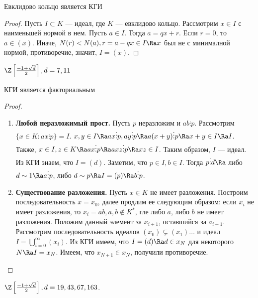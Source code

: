 \begin{theorem}
    Евклидово кольцо является КГИ
\end{theorem}
\begin{proof}
    Пусть \(I \subset K\) --- идеал, где \(K\) --- евклидово кольцо. Рассмотрим \(x \in I\) с наименьшей нормой в нем. Пусть \(a \in I\). Тогда \(a = qx + r\). Если \(r = 0\), то \(a \in (x)\). Иначе, \(N(r) < N(a), r = a - qx \in I \Ra x\) был не с минималной нормой, противоречие, значит, \(I = (x)\).
\end{proof}

\begin{example}
    \(\Z\left[ \frac{-1 + \sqrt{d}}{2} \right], d = 7, 11\)
\end{example}

\begin{theorem}
    КГИ является факториальным
\end{theorem}
\begin{proof}
    \begin{enumerate}
        \item \textbf{Любой неразложимый прост.} Пусть \(p\) неразложим и \(ab \vdots p\). Рассмотрим \(\{x \in K: ax \vdots p\} = I\). \(x, y \in I \Ra ax \vdots p, ay \vdots p \Ra a(x + y) \vdots p \Ra x + y \in I \Ra I\). Также, \(x \in I, z \in K \Ra ax \vdots p \Ra axz \vdots p \Ra xz \in I\). Таким образом, \(I\) --- идеал. Из КГИ знаем, что \(I = (d)\). Заметим, что \(p \in I, b \in I\). Тогда \(p \vdots d \Ra\) либо \(d \sim 1 \Ra a \vdots p\), либо \(d \sim p \Ra I = (p) \Ra b \vdots p\).
        \item \textbf{Существование разложения.} Пусть \(x \in K\) не имеет разложения. Построим последовательность \(x = x_0\), далее продлим ее следующим образом: если \(x_i\) не имеет разложения, то \(x_i = ab, a, b \notin K^*\), гле либо \(a\), либо \(b\) не имеет разложения. Положим данный элемент за \(x_{i + 1}\), оставшийся за \(a_{i + 1}\). Рассмотрим последовательность идеалов \((x_0) \subsetneq (x_1) \dots \) и идеал \(I = \bigcup_{i = 0}^\infty (x_i)\). Из КГИ имеем, что \(I = (d) \Ra d \in x_N\) для некоторого \(N \Ra I = x_N\). Имеем, что \(x_{N + 1} \in x_N\), получили противоречие.
    \end{enumerate}
\end{proof}

\begin{example}
    \(\Z\left[ \frac{-1 + \sqrt{d}}{2} \right], d = 19, 43, 67, 163\).
\end{example}

